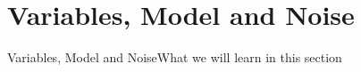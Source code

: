\section{Variables, Model and Noise}

\begin{frame}{Variables, Model and Noise}{What we will learn in this section}


    
\end{frame}